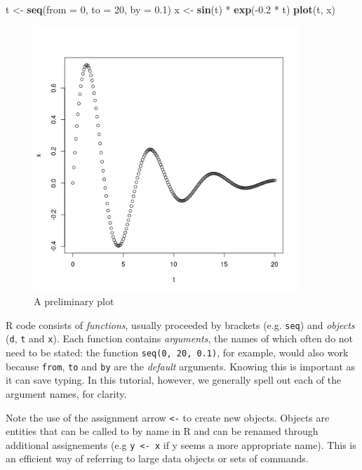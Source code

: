 \documentclass[]{article}
\newenvironment{Shaded}{}{}
\newcommand{\KeywordTok}[1]{\textcolor[rgb]{0.00,0.44,0.13}{\textbf{{#1}}}}
\newcommand{\DataTypeTok}[1]{\textcolor[rgb]{0.56,0.13,0.00}{{#1}}}
\newcommand{\DecValTok}[1]{\textcolor[rgb]{0.25,0.63,0.44}{{#1}}}
\newcommand{\FloatTok}[1]{\textcolor[rgb]{0.25,0.63,0.44}{{#1}}}
\newcommand{\NormalTok}[1]{{#1}}
\let\Oldincludegraphics\includegraphics
\renewcommand{\includegraphics}[1]{\Oldincludegraphics[width=10cm]{#1}}
\begin{document}
\begin{Shaded}
\begin{Highlighting}[]
\NormalTok{t <- }\KeywordTok{seq}\NormalTok{(}\DataTypeTok{from =} \DecValTok{0}\NormalTok{, }\DataTypeTok{to =} \DecValTok{20}\NormalTok{, }\DataTypeTok{by =} \FloatTok{0.1}\NormalTok{)}
\NormalTok{x <- }\KeywordTok{sin}\NormalTok{(t) * }\KeywordTok{exp}\NormalTok{(-}\FloatTok{0.2} \NormalTok{* t)}
\KeywordTok{plot}\NormalTok{(t, x)}
\end{Highlighting}
\end{Shaded}
\begin{figure}[htbp]
\centering
\includegraphics{figure/A_preliminary_plot.png}
\caption{A preliminary plot}
\end{figure}

R code consists of \emph{functions}, usually proceeded by brackets (e.g.
\texttt{seq}) and \emph{objects} (\texttt{d}, \texttt{t} and
\texttt{x}). Each function contains \emph{arguments}, the names of which
often do not need to be stated: the function \texttt{seq(0, 20, 0.1)},
for example, would also work because \texttt{from}, \texttt{to} and
\texttt{by} are the \emph{default} arguments. Knowing this is important
as it can save typing. In this tutorial, however, we generally spell out
each of the argument names, for clarity.

Note the use of the assignment arrow \texttt{\textless{}-} to create new
objects. Objects are entities that can be called to by name in R and can
be renamed through additional assignements (e.g
\texttt{y \textless{}- x} if y seems a more appropriate name). This is
an efficient way of referring to large data objects or sets of commands.
\end{document}
